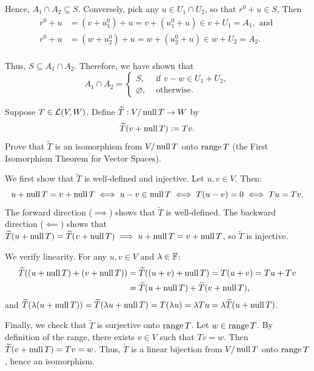\begin{xrcs}
\begin{xprf}
    Hence, $A_1 \cap A_2 \subseteq S$. Conversely, pick any $u \in U_1 \cap U_2$, so that $r^0 + u \in S$. Then
    \begin{equation}
      \begin{aligned}
        r^0 + u &= (v + u_1^0) + u = v + ( u_1^0 + u) \in v + U_1 = A_1, \text{ and } \\
        r^0 + u &= (w + u_2^0) + u = w + ( u_2^0 + u) \in w + U_2 = A_2.  \\
      \end{aligned}
    \end{equation}

    Thus, $S \subseteq A_1 \cap A_2$. Therefore, we have shown that
    \begin{equation}
      A_1 \cap A_2 =
      \begin{cases}
        S,            & \text{ if } v-w \in U_1 + U_2, \\
        \varnothing,  & \text{ otherwise. }
      \end{cases}
    \end{equation}
  \end{xprf}
\end{xrcs}

\begin{xrcs}
  Suppose $T \in \mathcal{L}(V,W)$. Define $\widetilde{T}: V/\operatorname{null} T \to W$ by
  \begin{equation}
    \widetilde{T}(v + \operatorname{null} T) := Tv.
  \end{equation}
  Prove that $\widetilde{T}$ is an isomorphism from $V/\operatorname{null} T$ onto $\operatorname{range} T$ (the First Isomorphism Theorem for Vector Spaces).
\begin{xprf}
  \StepOne We first show that $\widetilde{T}$ is well-defined and injective.
  Let $u, v \in V$. Then:
  \[
    u + \operatorname{null} T = v + \operatorname{null} T \iff u - v \in \operatorname{null} T \iff T(u-v) = 0 \iff Tu = Tv.
  \]
  The forward direction ($\implies$) shows that $\widetilde{T}$ is well-defined.
  The backward direction ($\impliedby$) shows that $\widetilde{T}(u + \operatorname{null} T) = \widetilde{T}(v + \operatorname{null} T) \implies u + \operatorname{null} T = v + \operatorname{null} T$, so $\widetilde{T}$ is injective.

  \StepTwo We verify linearity. For any $u, v \in V$ and $\lambda \in \mathbb{F}$:
  \[
  \begin{aligned}
    \widetilde{T}((u + \operatorname{null} T) + (v + \operatorname{null} T)) &= \widetilde{T}((u+v) + \operatorname{null} T) = T(u+v) = Tu + Tv \\
    &= \widetilde{T}(u + \operatorname{null} T) + \widetilde{T}(v + \operatorname{null} T),
  \end{aligned}
  \]
  and $\widetilde{T}(\lambda(u + \operatorname{null} T)) = \widetilde{T}(\lambda u + \operatorname{null} T) = T(\lambda u) = \lambda Tu = \lambda \widetilde{T}(u + \operatorname{null} T)$.

  \StepThree Finally, we check that $\widetilde{T}$ is surjective onto $\operatorname{range} T$.
  Let $w \in \operatorname{range} T$. By definition of the range, there exists $v \in V$ such that $Tv = w$.
  Then $\widetilde{T}(v + \operatorname{null} T) = Tv = w$.
  Thus, $\widetilde{T}$ is a linear bijection from $V/\operatorname{null} T$ onto $\operatorname{range} T$, hence an isomorphism.
\end{xprf}
\end{xrcs}


